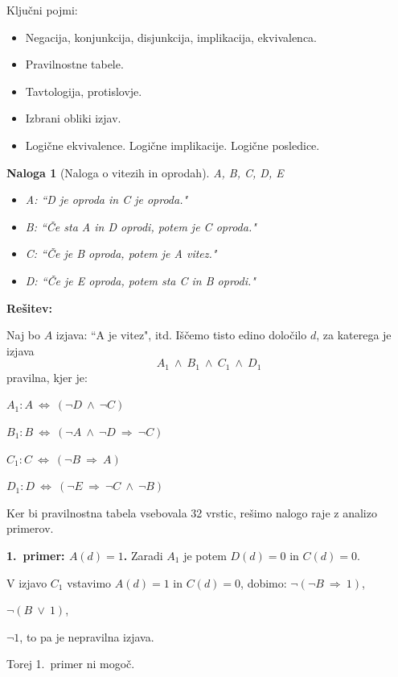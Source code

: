 \documentclass[11pt,paper=b5,footinclude,headinclude]{scrbook} %
\def\ali {{~\vee~}}
\def\inn {{~\wedge~}}
\def\sledi {{~\Rightarrow~}}
\def\cee {{~\Leftrightarrow~}}
\newtheorem*{problem}{Naloga}
\begin{document}
Ključni pojmi:
\begin{itemize}
  \item Negacija, konjunkcija, disjunkcija, implikacija, ekvivalenca.
  \item Pravilnostne tabele.
  \item Tavtologija, protislovje.
  \item Izbrani obliki izjav.
  \item Logične ekvivalence. Logične implikacije. Logične posledice.
\end{itemize}

\begin{problem}[Naloga o vitezih in oprodah]
A, B, C, D, E
\begin{itemize}
  \item A: ``D je oproda in C je oproda."
  \item B: ``Če sta A in D oprodi, potem je C oproda."
  \item C: ``Če je B oproda, potem je A vitez."
  \item D: ``Če je E oproda, potem sta C in B oprodi."
\end{itemize}
\end{problem}

\medskip
\textbf{Rešitev:}

Naj bo $A$ izjava: ``A je vitez", itd.
Iščemo tisto edino določilo $d$, za katerega je izjava $$A_1\inn B_1\inn C_1\inn D_1$$
pravilna, kjer je:

$A_1: A\cee (\neg D \inn \neg C)$

$B_1: B\cee (\neg A \inn \neg D\sledi \neg C)$

$C_1: C\cee (\neg B \sledi A)$

$D_1: D\cee (\neg E \sledi \neg C \inn \neg B)$


Ker bi pravilnostna tabela vsebovala 32 vrstic, rešimo nalogo
raje z analizo primerov.

\textbf{1.~primer: $A(d) = 1$.}
Zaradi $A_1$ je potem $D(d) = 0$ in $C(d) = 0$.

V izjavo $C_1$ vstavimo $A(d) = 1$ in $C(d) = 0$, dobimo:
$\neg(\neg B\sledi 1)$,

$\neg(B\ali 1)$,

$\neg 1$, to pa je nepravilna izjava.

Torej 1.~primer ni mogoč.
%
%
%
%
%
%
\end{document}

